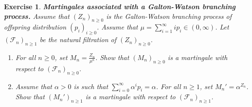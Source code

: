 \documentclass{article}
\newtheorem{exercise}[theorem]{Exercise}
\begin{document}
\begin{exercise}
\textbf{Martingales associated with a Galton-Watson branching process.} Assume that $(Z_n)_{n\geq0}$ is the Galton-Watson branching process of offspring distribution $(p_i)_{i\geq0}$. Assume that $\mu=\sum_{i=1}^\infty ip_i\in(0,\infty)$. Let $(\mathcal{F}_n)_{n\geq1}$ be the natural filtration of $(Z_n)_{n\geq0}$.
\begin{enumerate}
    \item[(a)] For all $n\geq0$, set $M_n=\frac{Z_n}{\mu^n}$. Show that $(M_n)_{n\geq0}$ is a martingale with respect to $(\mathcal{F}_n)_{n\geq0}$.
    \item[(b)] Assume that $\alpha>0$ is such that $\sum_{i=0}^\infty\alpha^ip_i=\alpha$. For all $n\geq1$, set $M_n'=\alpha^{Z_n}$. Show that $(M_n')_{n\geq1}$ is a martingale with respect to $(\mathcal{F}_n)_{n\geq1}$.
\end{enumerate}
\end{exercise}
\end{document}
